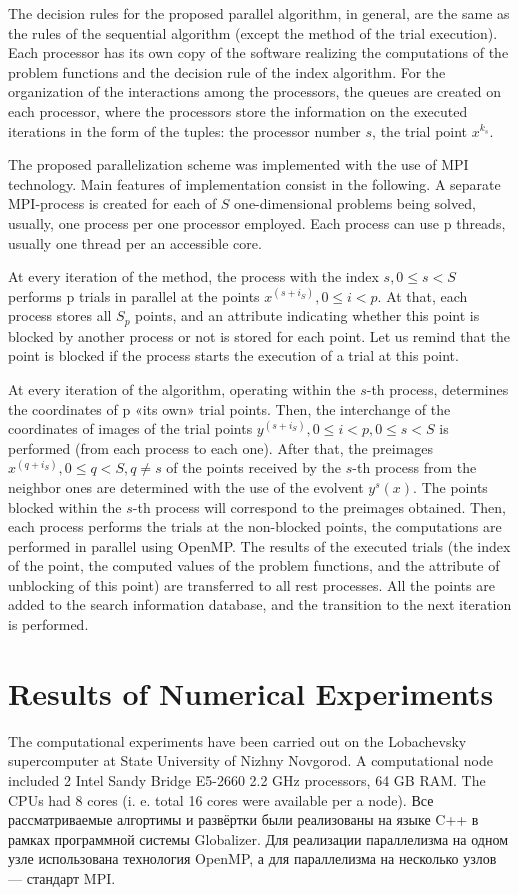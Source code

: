 \documentclass[runningheads]{llncs}
\begin{document}
The decision rules for the proposed parallel algorithm, in general, are the same as the rules of the sequential algorithm (except the method of the trial execution). Each processor has its own copy of the software realizing the computations of the problem functions and the decision rule of the index algorithm. For the organization of the interactions among the processors, the queues are created on each processor, where the processors store the information on the executed iterations in the form of the tuples: the processor number \(s\), the trial point \(x{}^{k_s}\).
\par
The proposed parallelization scheme was implemented with the use of MPI technology. Main features of implementation consist in the following. A separate MPI-process is created for each of \(S\) one-dimensional problems being solved, usually, one process per one processor employed. Each process can use p threads, usually one thread per an accessible core.
\par
At every iteration of the method, the process with the index \(s,0\leqslant s< S\) performs p trials in parallel at the points \(x^{(s+i_S)},0\leqslant i<p\). At that, each process stores all \(S_p\) points, and an attribute indicating whether this point is blocked by another process or not is stored for each point. Let us remind that the point is blocked if the process starts the execution of a trial at this point.
\par
At every iteration of the algorithm, operating within the \(s\)-th process, determines the coordinates of p «its own» trial points. Then, the interchange of the coordinates of images of the trial points \(y^{(s+i_S)},0\leqslant i<p, 0\leqslant s< S\) is performed (from each process to each one). After that, the preimages \(x^{(q+i_S)},0\leqslant q<S,q\not=s\) of the points received by the \(s\)-th process from the neighbor ones are determined with the use of the evolvent \(y^s (x)\). The points blocked within the \(s\)-th process will correspond to the preimages obtained. Then, each process performs the trials at the non-blocked points, the computations are performed in parallel using OpenMP. The results of the executed trials (the index of the point, the computed values of the problem functions, and the attribute of unblocking of this point) are transferred to all rest processes. All the points are added to the search information database, and the transition to the next iteration is performed.
\par

\section{Results of Numerical Experiments}
The computational experiments have been carried out on the Lobachevsky supercomputer at
State University of Nizhny Novgorod. A computational node included 2 Intel
Sandy Bridge E5-2660 2.2 GHz processors, 64 GB RAM. The CPUs had 8 cores (i. e. total 16 cores
were available per a node). Все рассматриваемые алгортимы и развёртки были реализованы на языке C++ в рамках программной системы Globalizer\cite{globalizerSystem}.
Для реализации параллелизма на одном узле использована технология OpenMP, а для параллелизма на несколько узлов --- стандарт MPI.
\end{document}
